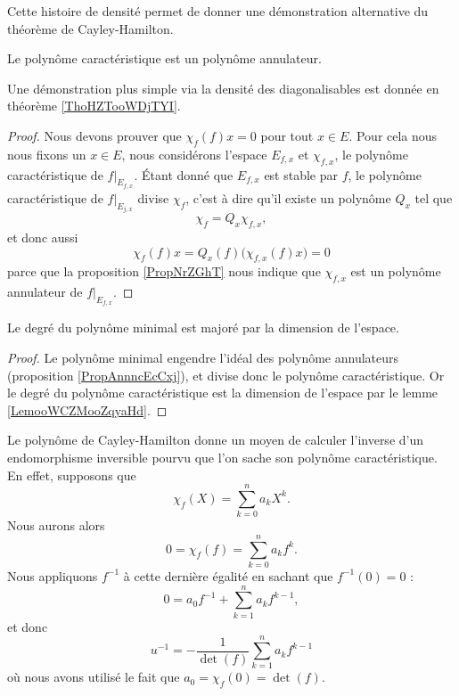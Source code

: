 Cette histoire de densité permet de donner une démonstration alternative du théorème de Cayley-Hamilton.
\begin{theorem}   \label{ThoCalYWLbJQ}
    Le polynôme caractéristique est un polynôme annulateur.
\end{theorem}

Une démonstration plus simple via la densité des diagonalisables est donnée en théorème \ref{ThoHZTooWDjTYI}.
\begin{proof}
    Nous devons prouver que \( \chi_f(f)x=0\) pour tout \( x\in E\). Pour cela nous nous fixons un \( x\in E\), nous considérons l'espace \( E_{f,x}\) et \( \chi_{f,x}\), le polynôme caractéristique de \( f|_{E_{f,x}}\). Étant donné que \( E_{f,x}\) est stable par \( f\), le polynôme caractéristique de \( f|_{E_{j,x}}\) divise \( \chi_f\), c'est à dire qu'il existe un polynôme \( Q_x\) tel que
    \begin{equation}
        \chi_f=Q_x\chi_{f,x},
    \end{equation}
    et donc aussi
    \begin{equation}
        \chi_f(f)x=Q_x(f)\big( \chi_{f,x}(f)x \big)=0
    \end{equation}
    parce que la proposition \ref{PropNrZGhT} nous indique que \( \chi_{f,x}\) est un polynôme annulateur de \( f|_{E_{f,x}}\).
\end{proof}

\begin{corollary}
    Le degré du polynôme minimal est majoré par la dimension de l'espace.
\end{corollary}

\begin{proof}
    Le polynôme minimal engendre l'idéal des polynôme annulateurs (proposition \ref{PropAnnncEcCxj}), et divise donc le polynôme caractéristique. Or le degré du polynôme caractéristique est la dimension de l'espace par le lemme \ref{LemooWCZMooZqyaHd}.
\end{proof}

\begin{example}
    Le polynôme de Cayley-Hamilton donne un moyen de calculer l'inverse d'un endomorphisme inversible pourvu que l'on sache son polynôme caractéristique. En effet, supposons que
    \begin{equation}
        \chi_f(X)=\sum_{k=0}^na_kX^k.
    \end{equation}
    Nous aurons alors
    \begin{equation}
        0=\chi_f(f)=\sum_{k=0}^na_kf^k.
    \end{equation}
    Nous appliquons \( f^{-1}\) à cette dernière égalité en sachant que \( f^{-1}(0)=0\) :
    \begin{equation}
        0=a_0f^{-1}+\sum_{k=1}^na_kf^{k-1},
    \end{equation}
    et donc
    \begin{equation}
        u^{-1}=-\frac{1}{ \det(f) }\sum_{k=1}^na_kf^{k-1}
    \end{equation}
    où nous avons utilisé le fait que \( a_0=\chi_f(0)=\det(f)\).
\end{example}

